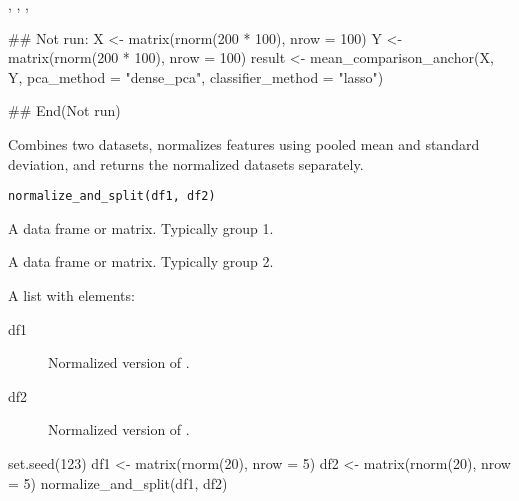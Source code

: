 \documentclass[a4paper]{book}
\begin{document}
%
\begin{SeeAlso}
, , , 
\end{SeeAlso}
%
\begin{Examples}
\begin{ExampleCode}
## Not run: 
X <- matrix(rnorm(200 * 100), nrow = 100)
Y <- matrix(rnorm(200 * 100), nrow = 100)
result <- mean_comparison_anchor(X, Y, pca_method = "dense_pca", classifier_method = "lasso")

## End(Not run)

\end{ExampleCode}
\end{Examples}
%
\begin{Description}
Combines two datasets, normalizes features using pooled mean and standard deviation,
and returns the normalized datasets separately.
\end{Description}
%
\begin{Usage}
\begin{verbatim}
normalize_and_split(df1, df2)
\end{verbatim}
\end{Usage}
%
\begin{Arguments}
\begin{ldescription}
\item[\code{df1}] A data frame or matrix. Typically group 1.

\item[\code{df2}] A data frame or matrix. Typically group 2.
\end{ldescription}
\end{Arguments}
%
\begin{Value}
A list with elements:
\begin{description}

\item[df1] Normalized version of .
\item[df2] Normalized version of .

\end{description}

\end{Value}
%
\begin{Examples}
\begin{ExampleCode}
set.seed(123)
df1 <- matrix(rnorm(20), nrow = 5)
df2 <- matrix(rnorm(20), nrow = 5)
normalize_and_split(df1, df2)

\end{ExampleCode}
\end{Examples}
\end{document}
